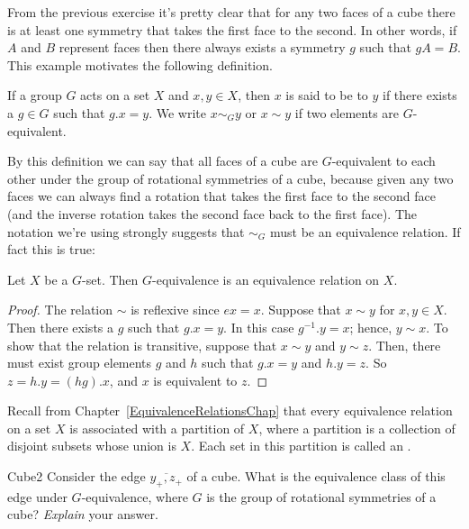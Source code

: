 From the previous exercise it's pretty clear that for any two faces of a cube there is at least one symmetry that takes the first face to the second.  In other words, if $A$ and $B$ represent faces then there always exists a symmetry $g$ such that $gA=B$.  This example motivates the following definition.

\begin{defn}\label{GEquivalent}
If a group $G$ acts on a set $X$ and $x, y \in X$, then $x$ is said to be
 to $y$ if there exists a
$g \in G$ such that $g.x =y$. We write $x \sim_Gy$ or $x \sim y$ if
two elements are $G$-equivalent.
\end{defn}
By this definition we can say that all faces of a cube are $G$-equivalent to each other under the group of rotational symmetries of a cube, because given any two faces we can always find a rotation that takes the first face to the second face (and the inverse rotation takes the second face back to the first face).
The notation we're using strongly suggests that $\sim_G$ must be an equivalence relation.  If fact this is true:

\begin{prop}{}
Let $X$ be a $G$-set. Then $G$-equivalence is an equivalence relation
on $X$. 
\end{prop}
\begin{proof}
The relation $\sim$ is reflexive since $ex = x$. Suppose that $x \sim
y$ for $x, y \in X$. Then there exists a $g$ such that $g.x = y$. In
this case $g^{-1}.y=x$; hence, $y \sim x$. To show that the relation is
transitive, suppose that $x \sim y$ and $y \sim z$. Then, there must
exist group elements $g$ and $h$ such that $g.x = y$ and $h.y= z$. So $z
= h.y = (hg).x$, and $x$ is equivalent to $z$.
\end{proof}

Recall from Chapter~\ref{EquivalenceRelationsChap} that every equivalence relation on a set $X$ is associated with a partition of $X$, where a partition is a collection of disjoint subsets whose union is $X$. Each set in this partition is called an .

\begin{exercise}{Cube2}
Consider the edge $\overline{y_+,z_+}$ of a cube.  What is the equivalence class of this edge under $G$-equivalence, where $G$ is the group of rotational symmetries of a cube? \emph{Explain} your answer.
\end {exercise}

